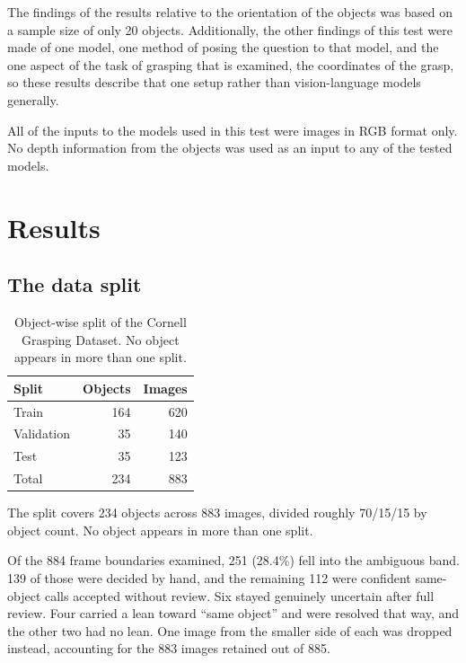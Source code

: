 \documentclass[12pt,letterpaper]{article}
\begin{document}
The findings of the results relative to the orientation of the objects
was based on a sample size of only 20 objects. Additionally, the other
findings of this test were made of one model, one method of posing the
question to that model, and the one aspect of the task of grasping that
is examined, the coordinates of the grasp, so these results describe
that one setup rather than vision-language models generally.

All of the inputs to the models used in this test were images in RGB
format only. No depth information from the objects was used as an input
to any of the tested models.

\section{Results}

\subsection{The data split}

\begin{table}[H]
\centering
\caption{Object-wise split of the Cornell Grasping Dataset. No object
appears in more than one split.}
\label{tab:split}
\begin{tabular}{lrr}
\toprule
Split & Objects & Images \\
\midrule
Train      & 164 & 620 \\
Validation &  35 & 140 \\
Test       &  35 & 123 \\
\midrule
Total      & 234 & 883 \\
\bottomrule
\end{tabular}
\end{table}

The split covers 234 objects across 883 images, divided roughly 70/15/15
by object count. No object appears in more than one split.

Of the 884 frame boundaries examined, 251 (28.4\%) fell into the
ambiguous band. 139 of those were decided by hand, and the remaining
112 were confident same-object calls accepted without review. Six
stayed genuinely uncertain after full review. Four carried a lean
toward ``same object'' and were resolved that way, and the other two had
no lean. One image from the smaller side of each was dropped instead,
accounting for the 883 images retained out of 885.
\end{document}
